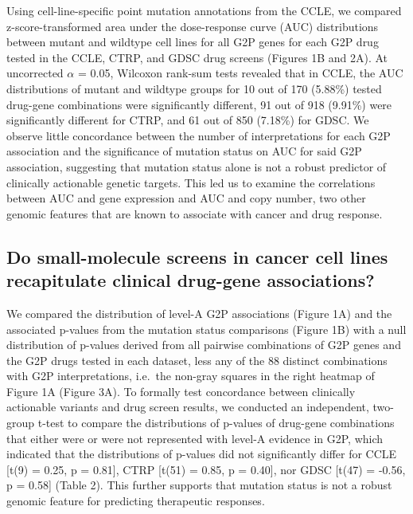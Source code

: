 \documentclass[man]{apa6}
\begin{document}
Using cell-line-specific point mutation annotations from the CCLE, we
compared z-score-transformed area under the dose-response curve (AUC)
distributions between mutant and wildtype cell lines for all G2P genes
for each G2P drug tested in the CCLE, CTRP, and GDSC drug screens
(Figures 1B and 2A). At uncorrected \(\alpha\) = 0.05, Wilcoxon rank-sum
tests revealed that in CCLE, the AUC distributions of mutant and
wildtype groups for 10 out of 170 (5.88\%) tested drug-gene combinations
were significantly different, 91 out of 918 (9.91\%) were significantly
different for CTRP, and 61 out of 850 (7.18\%) for GDSC. We observe
little concordance between the number of interpretations for each G2P
association and the significance of mutation status on AUC for said G2P
association, suggesting that mutation status alone is not a robust
predictor of clinically actionable genetic targets. This led us to
examine the correlations between AUC and gene expression and AUC and
copy number, two other genomic features that are known to associate with
cancer and drug response.

\subsection{Do small-molecule screens in cancer cell lines recapitulate
clinical drug-gene
associations?}\label{do-small-molecule-screens-in-cancer-cell-lines-recapitulate-clinical-drug-gene-associations}

We compared the distribution of level-A G2P associations (Figure 1A) and
the associated p-values from the mutation status comparisons (Figure 1B)
with a null distribution of p-values derived from all pairwise
combinations of G2P genes and the G2P drugs tested in each dataset, less
any of the 88 distinct combinations with G2P interpretations, i.e.~the
non-gray squares in the right heatmap of Figure 1A (Figure 3A). To
formally test concordance between clinically actionable variants and
drug screen results, we conducted an independent, two-group t-test to
compare the distributions of p-values of drug-gene combinations that
either were or were not represented with level-A evidence in G2P, which
indicated that the distributions of p-values did not significantly
differ for CCLE {[}t(9) = 0.25, p = 0.81{]}, CTRP {[}t(51) = 0.85, p =
0.40{]}, nor GDSC {[}t(47) = -0.56, p = 0.58{]} (Table 2). This further
supports that mutation status is not a robust genomic feature for
predicting therapeutic responses.
\end{document}
